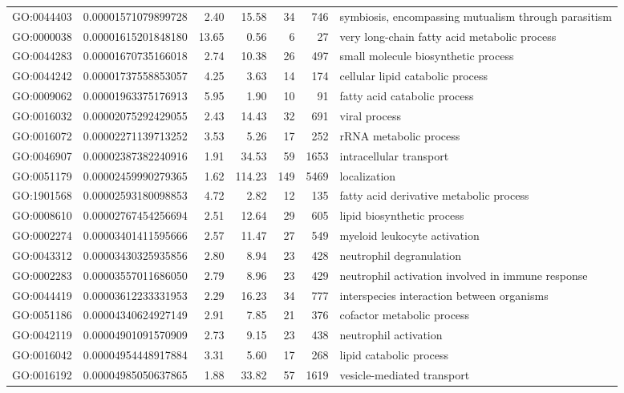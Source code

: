 \documentclass[letterpaper,12pt]{article}
\numberwithin{equation}{appendix}
\begin{document}
\begin{landscape}
{{\begin{longtable}{lrrrrrl}
  GO:0044403 & 0.00001571079899728 & 2.40 & 15.58 & 34 & 746 & symbiosis, encompassing mutualism through parasitism \\ 
  GO:0000038 & 0.00001615201848180 & 13.65 & 0.56 & 6 & 27 & very long-chain fatty acid metabolic process \\ 
  GO:0044283 & 0.00001670735166018 & 2.74 & 10.38 & 26 & 497 & small molecule biosynthetic process \\ 
  GO:0044242 & 0.00001737558853057 & 4.25 & 3.63 & 14 & 174 & cellular lipid catabolic process \\ 
  GO:0009062 & 0.00001963375176913 & 5.95 & 1.90 & 10 & 91 & fatty acid catabolic process \\ 
  GO:0016032 & 0.00002075292429055 & 2.43 & 14.43 & 32 & 691 & viral process \\ 
  GO:0016072 & 0.00002271139713252 & 3.53 & 5.26 & 17 & 252 & rRNA metabolic process \\ 
  GO:0046907 & 0.00002387382240916 & 1.91 & 34.53 & 59 & 1653 & intracellular transport \\ 
  GO:0051179 & 0.00002459990279365 & 1.62 & 114.23 & 149 & 5469 & localization \\ 
  GO:1901568 & 0.00002593180098853 & 4.72 & 2.82 & 12 & 135 & fatty acid derivative metabolic process \\ 
  GO:0008610 & 0.00002767454256694 & 2.51 & 12.64 & 29 & 605 & lipid biosynthetic process \\ 
  GO:0002274 & 0.00003401411595666 & 2.57 & 11.47 & 27 & 549 & myeloid leukocyte activation \\ 
  GO:0043312 & 0.00003430325935856 & 2.80 & 8.94 & 23 & 428 & neutrophil degranulation \\ 
  GO:0002283 & 0.00003557011686050 & 2.79 & 8.96 & 23 & 429 & neutrophil activation involved in immune response \\ 
  GO:0044419 & 0.00003612233331953 & 2.29 & 16.23 & 34 & 777 & interspecies interaction between organisms \\ 
  GO:0051186 & 0.00004340624927149 & 2.91 & 7.85 & 21 & 376 & cofactor metabolic process \\ 
  GO:0042119 & 0.00004901091570909 & 2.73 & 9.15 & 23 & 438 & neutrophil activation \\ 
  GO:0016042 & 0.00004954448917884 & 3.31 & 5.60 & 17 & 268 & lipid catabolic process \\ 
  GO:0016192 & 0.00004985050637865 & 1.88 & 33.82 & 57 & 1619 & vesicle-mediated transport \\ 

\end{longtable}}}
\end{landscape}
\end{document}
